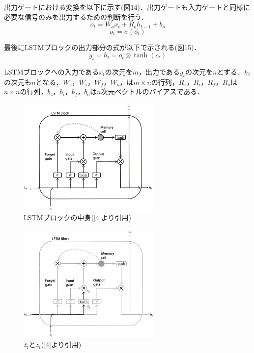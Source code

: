 \documentclass[twocolumn]{jsarticle}
\begin{document}
出力ゲートにおける変換を以下に示す(図14)．出力ゲートも入力ゲートと同様に必要な信号のみを出力するための判断を行う．
　 \begin{equation}
   \label{equation11}
      \overline{o_t} = W_ox_t + R_oh_{t-1} + b_o
   \end{equation}
   \begin{equation}
   \label{equation12}
      o_t = σ(\overline{o_t})
   \end{equation}

最後にLSTMブロックの出力部分の式が以下で示される(図15)．
   \begin{equation}
   \label{equation13}
      y_t = h_t = o_t \otimes \tanh (c_t)
   \end{equation}

LSTMブロックへの入力である$x_t$の次元を$m$，出力である$y_t$の次元を$n$とする．$h_t$の次元も$n$となる．$W_z，W_i，W_f，W_o，$は$m \times n$の行列，$R_z，R_i，R_f，R_o$は$n \times n$の行列，$b_z，b_i，b_f，b_o$は$n$次元ベクトルのバイアスである．
\begin{figure}[H]
	\centering
	\includegraphics[width=7cm]{LSTM.jpg}
	\caption{LSTMブロックの中身([4]より引用)}
	\label{fig08}
\end{figure}

\begin{figure}[H]
	\centering
	\includegraphics[width=7cm]{input.jpg}
	\caption{$\overline{z_t}$と$z_t$([4]より引用)}
	\label{fig09}
\end{figure}
\end{document}
